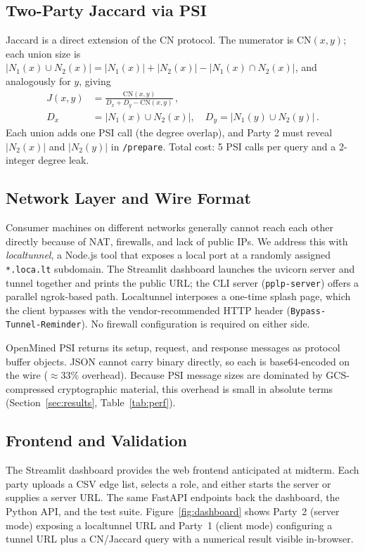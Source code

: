 \documentclass[sigconf]{acmart}
\begin{document}
\subsection{Two-Party Jaccard via PSI}
Jaccard is a direct extension of the CN protocol. The numerator is $\text{CN}(x,y)$; each union size is $|N_1(x) \cup N_2(x)| = |N_1(x)| + |N_2(x)| - |N_1(x) \cap N_2(x)|$, and analogously for $y$, giving
\begin{equation*}
  \begin{aligned}
    J(x,y) &= \frac{\mathrm{CN}(x,y)}{D_x + D_y - \mathrm{CN}(x,y)}\,, \\
    D_x &= \lvert N_1(x)\cup N_2(x)\rvert,\quad
    D_y = \lvert N_1(y)\cup N_2(y)\rvert\,.
  \end{aligned}
\end{equation*}
Each union adds one PSI call (the degree overlap), and Party 2 must reveal $|N_2(x)|$ and $|N_2(y)|$ in \texttt{/prepare}. Total cost: 5 PSI calls per query and a 2-integer degree leak.

\subsection{Network Layer and Wire Format}
Consumer machines on different networks generally cannot reach each other directly because of NAT, firewalls, and lack of public IPs. We address this with \emph{localtunnel}, a Node.js tool that exposes a local port at a randomly assigned \texttt{*.loca.lt} subdomain. The Streamlit dashboard launches the uvicorn server and tunnel together and prints the public URL; the CLI server (\texttt{pplp-server}) offers a parallel ngrok-based path. Localtunnel interposes a one-time splash page, which the client bypasses with the vendor-recommended HTTP header (\texttt{Bypass-Tunnel-Reminder}). No firewall configuration is required on either side.

OpenMined PSI returns its setup, request, and response messages as protocol buffer objects. JSON cannot carry binary directly, so each is base64-encoded on the wire ($\approx 33\%$ overhead). Because PSI message sizes are dominated by GCS-compressed cryptographic material, this overhead is small in absolute terms (Section~\ref{sec:results}, Table~\ref{tab:perf}).

\subsection{Frontend and Validation}
\label{sec:frontend}
The Streamlit dashboard provides the web frontend anticipated at midterm. Each party uploads a CSV edge list, selects a role, and either starts the server or supplies a server URL. The same FastAPI endpoints back the dashboard, the Python API, and the test suite. Figure~\ref{fig:dashboard} shows Party~2 (server mode) exposing a localtunnel URL and Party~1 (client mode) configuring a tunnel URL plus a CN/Jaccard query with a numerical result visible in-browser.
\end{document}
